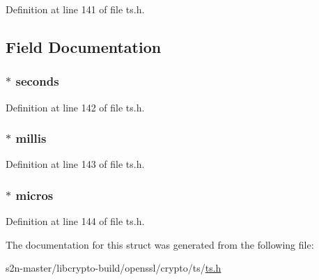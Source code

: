 Definition at line 141 of file ts.\+h.



\subsection{Field Documentation}
\subsubsection[{\texorpdfstring{seconds}{seconds}}]{ $\ast$ seconds}\hypertarget{struct_t_s__accuracy__st_ac2918a5dbb5a029747f5fab915d2fe6d}{}\label{struct_t_s__accuracy__st_ac2918a5dbb5a029747f5fab915d2fe6d}


Definition at line 142 of file ts.\+h.

\subsubsection[{\texorpdfstring{millis}{millis}}]{ $\ast$ millis}\hypertarget{struct_t_s__accuracy__st_afe1fff95f07a821e65c7cb3e91fc63b0}{}\label{struct_t_s__accuracy__st_afe1fff95f07a821e65c7cb3e91fc63b0}


Definition at line 143 of file ts.\+h.

\subsubsection[{\texorpdfstring{micros}{micros}}]{ $\ast$ micros}\hypertarget{struct_t_s__accuracy__st_a0b58c483824a9d659c9d66f0513d8b50}{}\label{struct_t_s__accuracy__st_a0b58c483824a9d659c9d66f0513d8b50}


Definition at line 144 of file ts.\+h.



The documentation for this struct was generated from the following file\+:\begin{DoxyCompactItemize}
\item 
s2n-\/master/libcrypto-\/build/openssl/crypto/ts/\hyperlink{crypto_2ts_2ts_8h}{ts.\+h}\end{DoxyCompactItemize}
